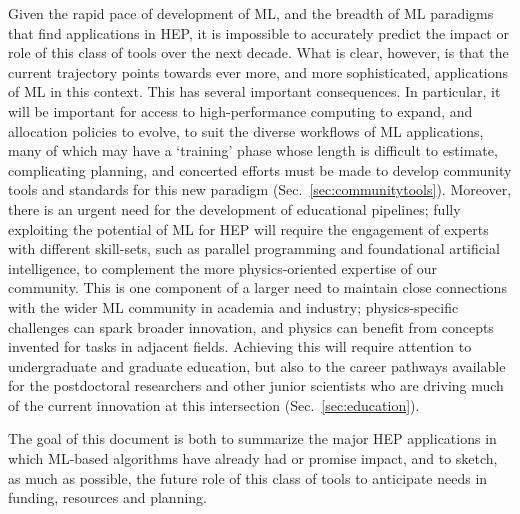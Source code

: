 \documentclass[submission,Phys]{SciPost}
\begin{document}
Given the rapid pace of development of ML, and the breadth of ML paradigms that find applications in HEP, it is impossible to accurately predict the impact or role of this class of tools over the next decade. What is clear, however, is that the current trajectory points towards ever more, and more sophisticated, applications of ML in this context. This has several important consequences. In particular, it will be important for access to high-performance computing to expand, and allocation policies to evolve, to suit the diverse workflows of ML applications, many of which may have a `training' phase whose length is difficult to estimate, complicating planning, and concerted efforts must be made to develop community tools and standards for this new paradigm (Sec.~\ref{sec:communitytools}). Moreover, there is an urgent need for the development of educational pipelines; fully exploiting the potential of ML for HEP will require the engagement of experts with different skill-sets,
such as parallel programming and foundational artificial intelligence, to complement the more physics-oriented expertise of our community. This is one component of a larger need to maintain close connections with the wider ML community in academia and industry; physics-specific challenges can spark broader innovation, and physics can benefit from concepts invented for tasks in adjacent fields. Achieving this will require attention to undergraduate and graduate education, but also to the career pathways available for the postdoctoral researchers and other junior scientists who are driving much of the current innovation at this intersection (Sec.~\ref{sec:education}).

The goal of this document is both to summarize the major HEP applications in which ML-based algorithms have already had or promise impact, and to sketch, as much as possible, the future role of this class of tools to anticipate needs in funding, resources and planning.



\begin{comment}
\begin{itemize}
    \item ML has been very important in the last 10 years. Cite reviews:~\cite{Guest:2018yhq,Radovic:2018dip,Carleo:2019ptp,Karagiorgi:2021ngt}
    \item Some themes have emerged, where ML has contributed to to HEP: first principle calculations, analyzing high-dimensional data, anomaly detection, speeding up simulations, etc.
    \item Given the rapid pace of innovation and the large community of ML research that can find applications in HEP, it's impossible to accurately predict the role, but clearly, ML will be important in the next 10 years.
    \item Goal of this document: describe major areas in which ML has contributed and sketch out possible future role to anticipate needs in funding, resources and planning.
    \item Outline topics discussed.
\end{itemize}
\end{comment}
\end{document}
